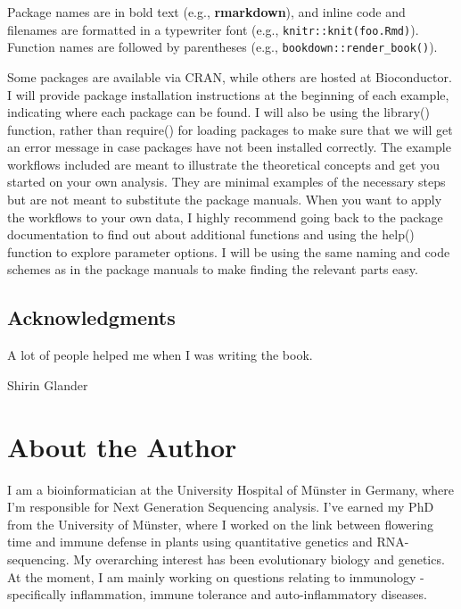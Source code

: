\documentclass[12pt,]{krantz}
\let\BeginKnitrBlock\begin \let\EndKnitrBlock\end
\begin{document}
Package names are in bold text (e.g., \textbf{rmarkdown}), and inline
code and filenames are formatted in a typewriter font (e.g.,
\texttt{knitr::knit(\textquotesingle{}foo.Rmd\textquotesingle{})}).
Function names are followed by parentheses (e.g.,
\texttt{bookdown::render\_book()}).

Some packages are available via CRAN, while others are hosted at
Bioconductor. I will provide package installation instructions at the
beginning of each example, indicating where each package can be found. I
will also be using the library() function, rather than require() for
loading packages to make sure that we will get an error message in case
packages have not been installed correctly. The example workflows
included are meant to illustrate the theoretical concepts and get you
started on your own analysis. They are minimal examples of the necessary
steps but are not meant to substitute the package manuals. When you want
to apply the workflows to your own data, I highly recommend going back
to the package documentation to find out about additional functions and
using the help() function to explore parameter options. I will be using
the same naming and code schemes as in the package manuals to make
finding the relevant parts easy.

\section*{Acknowledgments}\label{acknowledgments}


A lot of people helped me when I was writing the book.

\BeginKnitrBlock{flushright}
Shirin Glander
\EndKnitrBlock{flushright}

\chapter*{About the Author}\label{about-the-author}


I am a bioinformatician at the University Hospital of Münster in
Germany, where I'm responsible for Next Generation Sequencing analysis.
I've earned my PhD from the University of Münster, where I worked on the
link between flowering time and immune defense in plants using
quantitative genetics and RNA-sequencing. My overarching interest has
been evolutionary biology and genetics. At the moment, I am mainly
working on questions relating to immunology - specifically inflammation,
immune tolerance and auto-inflammatory diseases.
\end{document}
